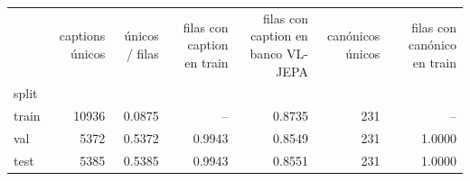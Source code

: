 \begin{tabular}{lrrrrrr}
\toprule
 & captions únicos & únicos / filas & filas con caption en train & filas con caption en banco VL-JEPA & canónicos únicos & filas con canónico en train \\
split &  &  &  &  &  &  \\
\midrule
train & 10936 & 0.0875 & -- & 0.8735 & 231 & -- \\
val & 5372 & 0.5372 & 0.9943 & 0.8549 & 231 & 1.0000 \\
test & 5385 & 0.5385 & 0.9943 & 0.8551 & 231 & 1.0000 \\
\bottomrule
\end{tabular}
